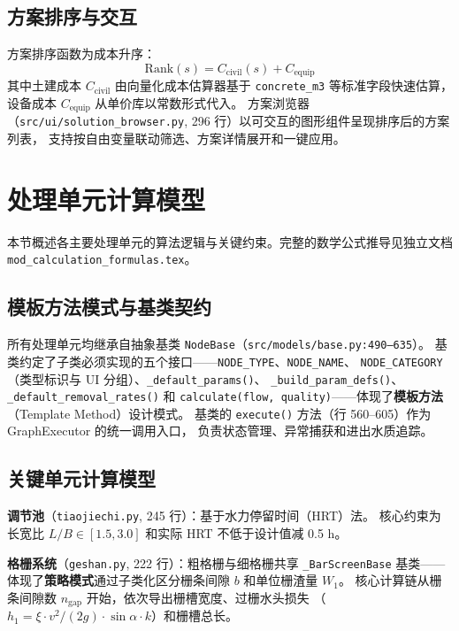 \documentclass[12pt,a4paper]{ctexart}
\theoremstyle{definition}
\theoremstyle{remark}
\begin{document}
\subsection{方案排序与交互}

方案排序函数为成本升序：
\[
\text{Rank}(s) = C_{\text{civil}}(s) + C_{\text{equip}}
\]
其中土建成本 $C_{\text{civil}}$ 由向量化成本估算器基于 \texttt{concrete\_m3} 等标准字段快速估算，
设备成本 $C_{\text{equip}}$ 从单价库以常数形式代入。
方案浏览器（\texttt{src/ui/solution\_browser.py}, 296 行）以可交互的图形组件呈现排序后的方案列表，
支持按自由变量联动筛选、方案详情展开和一键应用。

\section{处理单元计算模型}

本节概述各主要处理单元的算法逻辑与关键约束。完整的数学公式推导见独立文档
\texttt{mod\_calculation\_formulas.tex}。

\subsection{模板方法模式与基类契约}

所有处理单元均继承自抽象基类 \texttt{NodeBase}（\texttt{src/models/base.py:490--635}）。
基类约定了子类必须实现的五个接口——\texttt{NODE\_TYPE}、\texttt{NODE\_NAME}、
\texttt{NODE\_CATEGORY}（类型标识与 UI 分组）、\texttt{\_default\_params()}、
\texttt{\_build\_param\_defs()}、\texttt{\_default\_removal\_rates()} 和
\texttt{calculate(flow, quality)}——体现了\textbf{模板方法}（Template Method）设计模式。
基类的 \texttt{execute()} 方法（行 560--605）作为 GraphExecutor 的统一调用入口，
负责状态管理、异常捕获和进出水质追踪。

\subsection{关键单元计算模型}

\textbf{调节池}（\texttt{tiaojiechi.py}, 245 行）：基于水力停留时间（HRT）法。
核心约束为长宽比 $L/B \in [1.5, 3.0]$ 和实际 HRT 不低于设计值减 0.5 h。

\textbf{格栅系统}（\texttt{geshan.py}, 222 行）：粗格栅与细格栅共享
\texttt{\_BarScreenBase} 基类——体现了\textbf{策略模式}通过子类化区分栅条间隙 $b$ 和单位栅渣量 $W_1$。
核心计算链从栅条间隙数 $n_{\text{gap}}$ 开始，依次导出栅槽宽度、过栅水头损失
（$h_1 = \xi \cdot v^2/(2g) \cdot \sin\alpha \cdot k$）和栅槽总长。
\end{document}

